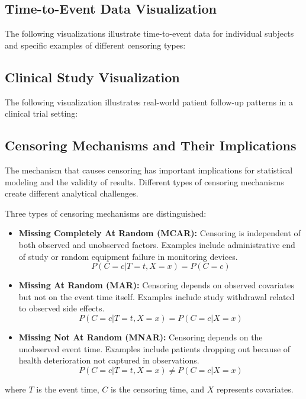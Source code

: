 \subsection{Time-to-Event Data Visualization}
\label{subsec:time-to-event}

The following visualizations illustrate time-to-event data for individual subjects and specific examples of different censoring types:



\subsection{Clinical Study Visualization}
\label{subsec:clinical-censoring}

The following visualization illustrates real-world patient follow-up patterns in a clinical trial setting:



\subsection{Censoring Mechanisms and Their Implications}
\label{subsec:censoring-mechanisms}

The mechanism that causes censoring has important implications for statistical modeling and the validity of results. Different types of censoring mechanisms create different analytical challenges.

\begin{definitionbox}[title=Censoring Mechanisms]
Three types of censoring mechanisms are distinguished:

\begin{itemize}
    \item \textbf{Missing Completely At Random (MCAR):} Censoring is independent of both observed and unobserved factors. Examples include administrative end of study or random equipment failure in monitoring devices.
    \begin{equation}
        P(C = c | T = t, X = x) = P(C = c)
    \end{equation}
    
    \item \textbf{Missing At Random (MAR):} Censoring depends on observed covariates but not on the event time itself. Examples include study withdrawal related to observed side effects.
    \begin{equation}
        P(C = c | T = t, X = x) = P(C = c | X = x)
    \end{equation}
    
    \item \textbf{Missing Not At Random (MNAR):} Censoring depends on the unobserved event time. Examples include patients dropping out because of health deterioration not captured in observations.
    \begin{equation}
        P(C = c | T = t, X = x) \neq P(C = c | X = x)
    \end{equation}
\end{itemize}

where $T$ is the event time, $C$ is the censoring time, and $X$ represents covariates.
\end{definitionbox}

